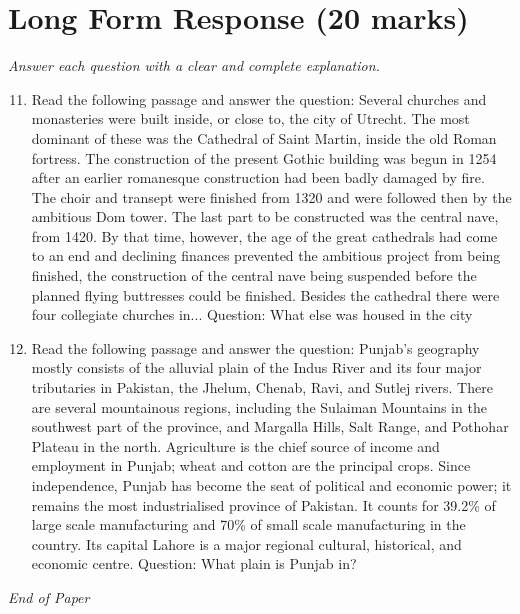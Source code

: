 \documentclass[12pt]{article}
\begin{document}
\section*{Long Form Response (20 marks)}
\textit{Answer each question with a clear and complete explanation.}
\begin{enumerate}[label=\arabic*.]
\setcounter{enumi}{10}
\item Read the following passage and answer the question: Several churches and monasteries were built inside, or close to, the city of Utrecht. The most dominant of these was the Cathedral of Saint Martin, inside the old Roman fortress. The construction of the present Gothic building was begun in 1254 after an earlier romanesque construction had been badly damaged by fire. The choir and transept were finished from 1320 and were followed then by the ambitious Dom tower. The last part to be constructed was the central nave, from 1420. By that time, however, the age of the great cathedrals had come to an end and declining finances prevented the ambitious project from being finished, the construction of the central nave being suspended before the planned flying buttresses could be finished. Besides the cathedral there were four collegiate churches in... Question: What else was housed in the city
\item Read the following passage and answer the question: Punjab's geography mostly consists of the alluvial plain of the Indus River and its four major tributaries in Pakistan, the Jhelum, Chenab, Ravi, and Sutlej rivers. There are several mountainous regions, including the Sulaiman Mountains in the southwest part of the province, and Margalla Hills, Salt Range, and Pothohar Plateau in the north. Agriculture is the chief source of income and employment in Punjab; wheat and cotton are the principal crops. Since independence, Punjab has become the seat of political and economic power; it remains the most industrialised province of Pakistan. It counts for 39.2\% of large scale manufacturing and 70\% of small scale manufacturing in the country. Its capital Lahore is a major regional cultural, historical, and economic centre. Question: What plain is Punjab in?
\end{enumerate}

\vfill
\noindent\textit{End of Paper}
\end{document}
